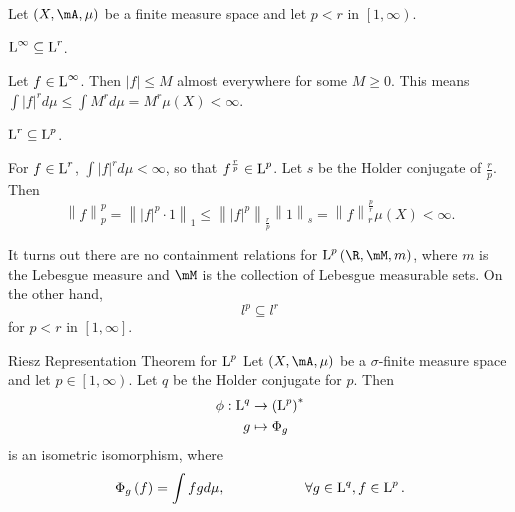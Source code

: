 \documentclass[pmath451]{subfiles}
\begin{document}
    \rruleline
    
    \begin{example}{}
        Let $\left( X,\mA,\mu \right)$ be a finite measure space and let $p<r$ in $\left[ 1,\infty \right)$. 

        \begin{claim}
            $\operatorname{L}^{\infty}\subseteq\operatorname{L}^r$.

            Let $f\in\operatorname{L}^{\infty}$. Then $\left| f \right|\leq M$ almost everywhere for some $M\geq 0$. This means $\int\left| f \right|^rd\mu \leq \int M^rd\mu = M^r\mu\left( X \right) < \infty$.
        \end{claim}

        \begin{claim}
            $\operatorname{L}^r\subseteq\operatorname{L}^p$.

            For $f\in\operatorname{L}^r$, $\int\left| f \right|^rd\mu<\infty$, so that $f^{\frac{r}{p}}\in\operatorname{L}^p$. Let $s$ be the Holder conjugate of $\frac{r}{p}$. Then
            \begin{equation*}
                \left\lVert f\right\rVert^p_p = \left\lVert \left| f \right|^p\cdot 1\right\rVert_1 \leq \left\lVert \left| f \right|^p\right\rVert_{\frac{r}{p}}\left\lVert 1\right\rVert_s = \left\lVert f\right\rVert_r^{\frac{p}{r}} \mu\left( X \right) < \infty.
            \end{equation*}
        \end{claim}
    \end{example}

    \rruleline

    \clearpage
    
    \np It turns out there are no containment relations for $\LLL^p\left( \R,\mM,m \right)$, where $m$ is the Lebesgue measure and $\mM$ is the collection of Lebesgue measurable sets. On the other hand,
    \begin{equation*}
        l^p\subseteq l^r
    \end{equation*}
    for $p<r$ in $\left[ 1,\infty \right]$.
    
    \begin{theorem}{Riesz Representation Theorem for $\operatorname{L}^p$}
        Let $\left( X,\mA,\mu \right)$ be a $\sigma$-finite measure space and let $p\in\left[ 1,\infty \right)$. Let $q$ be the Holder conjugate for $p$. Then
        \begin{equation*}
            \begin{aligned}
                \phi:\operatorname{L}^q&\to\left( \operatorname{L}^p \right)^{*} \\
                g & \mapsto \Phi_g
            \end{aligned} 
        \end{equation*}
        is an isometric isomorphism, where
        \begin{equation*}
            \Phi_g\left( f \right) = \int fgd\mu, \hspace{2cm}\forall g\in\operatorname{L}^q, f\in\operatorname{L}^p.
        \end{equation*}
    \end{theorem}
    
\end{document}

